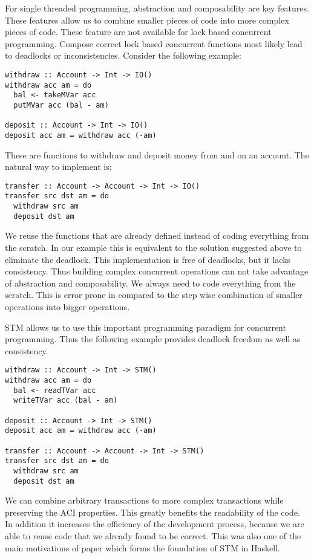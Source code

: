 For single threaded programming, abstraction and composability are key features. These features allow us to combine smaller pieces
of code into more complex pieces of code. These feature are not available for lock based concurrent programming. Compose correct lock based
concurrent functions most likely lead to deadlocks or inconsistencies. Consider the following example:
\begin{lstlisting}
withdraw :: Account -> Int -> IO()
withdraw acc am = do 
  bal <- takeMVar acc 
  putMVar acc (bal - am)
 
deposit :: Account -> Int -> IO()
deposit acc am = withdraw acc (-am)
\end{lstlisting}
These are functions to withdraw and deposit money from and on an account. The natural way to implement  is:
\begin{lstlisting}
transfer :: Account -> Account -> Int -> IO()
transfer src dst am = do
  withdraw src am
  deposit dst am
\end{lstlisting}
We reuse the functions that are already defined instead of coding everything from the scratch. In our example this is equivalent 
to the solution suggested above to eliminate the deadlock. This implementation is free of deadlocks, but it lacks consistency.
Thus building complex concurrent operations can not take advantage of abstraction and composability. We always need to code
everything from the scratch. This is error prone in compared to the step wise combination of smaller operations into 
bigger operations.

STM allows us to use this important programming paradigm for concurrent programming. Thus the following example provides
deadlock freedom as well as consistency.
\begin{lstlisting}
withdraw :: Account -> Int -> STM()
withdraw acc am = do 
  bal <- readTVar acc 
  writeTVar acc (bal - am)
 
deposit :: Account -> Int -> STM()
deposit acc am = withdraw acc (-am)

transfer :: Account -> Account -> Int -> STM()
transfer src dst am = do
  withdraw src am
  deposit dst am
\end{lstlisting}
We can combine arbitrary transactions to more complex transactions while preserving the ACI properties. This greatly benefits the 
readability of the code. In addition it increases the efficiency of the development process, because we are able to reuse code
that we already found to be correct. This was also one of the main motivations of paper \parencite{STMBase} which forms the foundation
of STM in Haskell.

